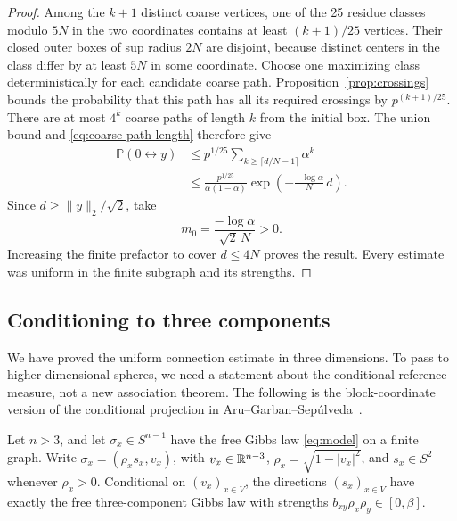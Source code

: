\begin{proof}
Among the $k+1$ distinct coarse vertices, one of the 25 residue classes
modulo $5N$ in the two coordinates contains at least $(k+1)/25$
vertices.  Their closed outer boxes of sup radius $2N$ are disjoint,
because distinct centers in the class differ by at least $5N$ in
some coordinate.  Choose one maximizing class deterministically for
each candidate coarse path.  Proposition~\ref{prop:crossings} bounds
the probability that this path has all its required crossings by
$p^{(k+1)/25}$.  There are at most $4^k$ coarse paths of length $k$
from the initial box.  The union bound and
\eqref{eq:coarse-path-length} therefore give
\begin{align*}
 \mathbb P(0\leftrightarrow y)
 &\leq p^{1/25}\sum_{k\geq\lceil d/N-1\rceil}\alpha^k\\
 &\leq \frac{p^{1/25}}{\alpha(1-\alpha)}
           \exp\left(-\frac{-\log\alpha}{N}\,d\right).
\end{align*}
Since $d\geq\|y\|_2/\sqrt2$, take
\[
 m_0=\frac{-\log\alpha}{\sqrt2\,N}>0.
\]
Increasing the finite prefactor to cover $d\leq4N$ proves the result.
Every estimate was uniform in the finite subgraph and its strengths.
\end{proof}

\subsection{Conditioning to three components}

We have proved the uniform connection estimate in three dimensions.
To pass to higher-dimensional spheres, we need a statement about the
conditional reference measure, not a new association theorem.
The following is the block-coordinate version of the conditional
projection in Aru--Garban--Sep\'ulveda~\cite[Proposition~2.4]{AGS}.

\begin{lemma}\label{lem:conditioning}
Let $n>3$, and let $\sigma_x\in S^{n-1}$ have the free Gibbs law
\eqref{eq:model} on a finite graph. Write
$\sigma_x=(\rho_x s_x,v_x)$, with $v_x\in\mathbb R^{n-3}$,
$\rho_x=\sqrt{1-|v_x|^2}$, and $s_x\in S^2$ whenever $\rho_x>0$.
Conditional on $(v_x)_{x\in V}$, the directions $(s_x)_{x\in V}$ have
exactly the free three-component Gibbs law with strengths
$b_{xy}\rho_x\rho_y\in[0,\beta]$.
\end{lemma}

